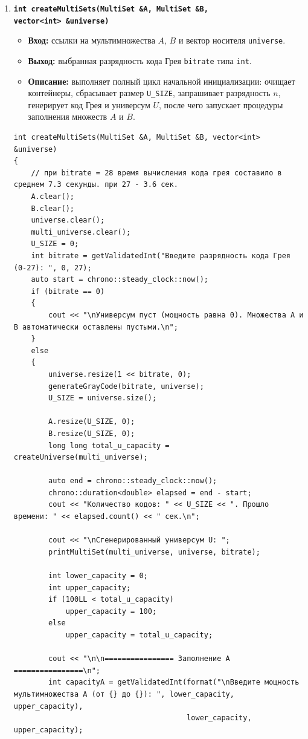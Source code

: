 \documentclass[14pt, a4paper]{extarticle}
\begin{document}
\begin{enumerate}[label=\arabic*., resume]
		\item \textbf{\texttt{int createMultiSets(MultiSet \&A, MultiSet \&B, \\ vector<int> \&universe)}}
		\begin{itemize}[leftmargin=*, noitemsep]
			\item \textbf{Вход:} ссылки на мультимножества $A$, $B$ и вектор носителя \texttt{universe}.
			\item \textbf{Выход:} выбранная разрядность кода Грея \texttt{bitrate} типа \texttt{int}.
			\item \textbf{Описание:} выполняет полный цикл начальной инициализации: очищает контейнеры, сбрасывает размер \texttt{U\_SIZE}, запрашивает разрядность $n$, генерирует код Грея и универсум $U$, после чего запускает процедуры заполнения множеств $A$ и $B$.
		\end{itemize}
		\begin{lstlisting}[caption={Функция createMultiSets()}, label={lst:func_create_multisets}]
int createMultiSets(MultiSet &A, MultiSet &B, vector<int> &universe)
{
    // при bitrate = 28 время вычисления кода грея составило в среднем 7.3 секунды. при 27 - 3.6 сек.
    A.clear();
    B.clear();
    universe.clear();
    multi_universe.clear();
    U_SIZE = 0;
    int bitrate = getValidatedInt("Введите разрядность кода Грея (0-27): ", 0, 27);
    auto start = chrono::steady_clock::now();
    if (bitrate == 0)
    {
        cout << "\nУниверсум пуст (мощность равна 0). Множества A и B автоматически оставлены пустыми.\n";
    }
    else
    {
        universe.resize(1 << bitrate, 0);
        generateGrayCode(bitrate, universe);
        U_SIZE = universe.size();

        A.resize(U_SIZE, 0);
        B.resize(U_SIZE, 0);
        long long total_u_capacity = createUniverse(multi_universe);

        auto end = chrono::steady_clock::now();
        chrono::duration<double> elapsed = end - start;
        cout << "Количество кодов: " << U_SIZE << ". Прошло времени: " << elapsed.count() << " сек.\n";

        cout << "\nСгенерированный универсум U: ";
        printMultiSet(multi_universe, universe, bitrate);

        int lower_capacity = 0;
        int upper_capacity;
        if (100LL < total_u_capacity)
            upper_capacity = 100;
        else
            upper_capacity = total_u_capacity;

        cout << "\n\n================ Заполнение A ================\n";
        int capacityA = getValidatedInt(format("\nВведите мощность мультимножества A (от {} до {}): ", lower_capacity, upper_capacity),
                                        lower_capacity, upper_capacity);


\end{lstlisting}
\end{enumerate}
\end{document}
